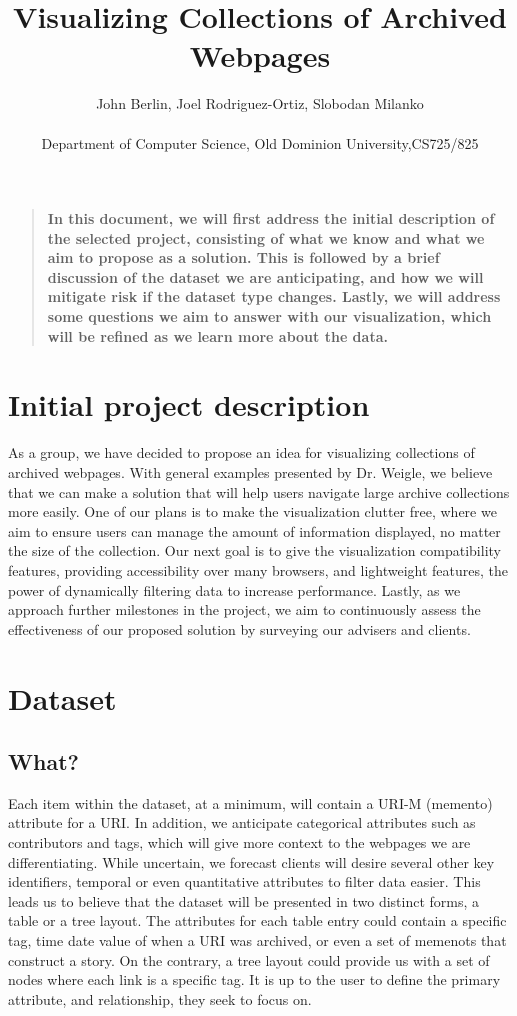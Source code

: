 \documentclass[12pt]{article}
\title{Visualizing Collections of Archived Webpages}
\author
{John Berlin, Joel Rodriguez-Ortiz, Slobodan Milanko\\
\\
\normalsize{Department of Computer Science, Old Dominion University,CS725/825}\\
}
\date{}
\newenvironment{sciabstract}{%
\begin{quote} \bf}
{\end{quote}}
\begin{document}
 
\baselineskip24pt
\maketitle 

\begin{sciabstract}
  In this document, we will first address the initial description of the selected project, consisting of what we know and what we aim to propose as a solution. This is followed by a brief discussion of the dataset we are anticipating, and how we will mitigate risk if the dataset type changes. Lastly, we will address some questions we aim to answer with our visualization, which will be refined as we learn more about the data.
  
\end{sciabstract}


\section*{Initial project description}

As a group, we have decided to propose an idea for visualizing collections of archived webpages. With general examples presented by Dr. Weigle, we believe that we can make a solution that will help users navigate large archive collections more easily. One of our plans is to make the visualization clutter free, where we aim to ensure users can manage the amount of information displayed, no matter the size of the collection. Our next goal is to give the visualization compatibility features, providing accessibility over many browsers, and lightweight features, the power of dynamically filtering data to increase performance. Lastly, as we approach further milestones in the project, we aim to continuously assess the effectiveness of our proposed solution by surveying our advisers and clients.

\section*{Dataset}

\subsection*{What?}

Each item within the dataset, at a minimum, will contain a URI-M (memento) attribute for a URI. In addition, we anticipate categorical attributes such as contributors and tags, which will give more context to the webpages we are differentiating. While uncertain, we forecast clients will desire several other key identifiers, temporal or even quantitative attributes to filter data easier.  This leads us to believe that the dataset will be presented in two distinct forms, a table or a tree layout. The attributes for each table entry could contain a specific tag, time date value of when a URI was archived, or even a set of memenots that construct a story. On the contrary, a tree layout could provide us with a set of nodes where each link is a specific tag. It is up to the user to define the primary attribute, and relationship, they seek to focus on.  
\end{document}
